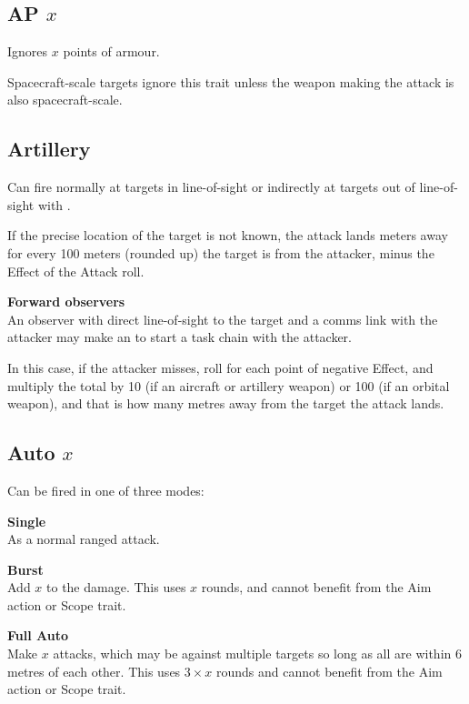 \documentclass{cheatsheet}
\begin{document}
\begin{multicols}{3}
\subsection{AP $x$}

Ignores $x$ points of armour.

Spacecraft-scale targets ignore this trait unless the weapon making
the attack is also spacecraft-scale.

\subsection{Artillery}

Can fire normally at targets in line-of-sight or indirectly at targets
out of line-of-sight with .

If the precise location of the target is not known, the attack lands
 meters away for every 100 meters (rounded up) the target is
from the attacker, minus the Effect of the Attack roll.

\textbf{Forward observers}\\
An observer with direct line-of-sight to the target and a comms link
with the attacker may make an 
to start a task chain with the attacker.

In this case, if the attacker misses, roll  for each point of
negative Effect, and multiply the total by 10 (if an aircraft or
artillery weapon) or 100 (if an orbital weapon), and that is how many
metres away from the target the attack lands.

\subsection{Auto $x$}

Can be fired in one of three modes:

\textbf{Single}\\
As a normal ranged attack.

\textbf{Burst}\\
Add $x$ to the damage.  This uses $x$ rounds, and cannot benefit from
the Aim action or Scope trait.

\textbf{Full Auto}\\
Make $x$ attacks, which may be against multiple targets so long as all
are within 6 metres of each other.  This uses $3 \times x$ rounds and
cannot benefit from the Aim action or Scope trait.


\end{multicols}
\end{document}

